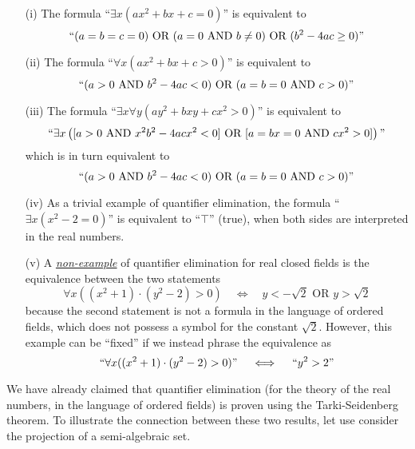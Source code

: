 \documentclass[12pt]{article}
\theoremstyle{definition}
\theoremstyle{remark}
\numberwithin{equation}{section}
\begin{document}
\begin{itemize}
    \item[(i)] The formula ``$\exists x(ax^2+bx+c=0)$''
    is equivalent to
    \begin{equation*}
        ``(a=b=c=0)\text{ OR }(a=0\text{ AND }b\neq 0)\text{ OR }(b^2-4ac\geq 0)\text{''}
    \end{equation*}
    \item[(ii)] The formula ``$\forall x(ax^2+bx+c>0)$'' is equivalent to
    \begin{equation*}
        ``(a>0\text{ AND }b^2-4ac<0)\text{ OR }(a=b=0\text{ AND }c>0)\text{''}
    \end{equation*}
    \item[(iii)] The formula ``$\exists x\forall y(ay^2+bxy+cx^2>0)$'' is equivalent to
    \begin{equation*}
        ``\exists x\left([a>0\text{ AND }x^2b^2-4acx^2<0]\text{ OR }[a=bx=0\text{ AND }cx^2>0]\right)\text{''}
    \end{equation*}
    which is in turn equivalent to
    \begin{equation*}
        ``(a>0\text{ AND }b^2-4ac<0)\text{ OR }(a=b=0\text{ AND }c>0)\text{''}
    \end{equation*}
    \item[(iv)] As a trivial example of quantifier elimination, the formula ``$\exists x(x^2-2=0)$'' is equivalent to ``$\top$'' (true), when both sides are interpreted in the real numbers.
    \item[(v)] A \underline{\textit{non-example}} of quantifier elimination for real closed fields is the equivalence between the two statements
    \begin{equation*}
        \forall x((x^2+1)\cdot(y^2-2)>0)\quad\iff\quad y<-\sqrt{2}\text{ OR }y>\sqrt{2}
    \end{equation*}
    because the second statement is not a formula in the language of ordered fields, which does not possess a symbol for the constant $\sqrt{2}$. However, this example can be ``fixed'' if we instead phrase the equivalence as
    \begin{equation*}
        ``\forall x((x^2+1)\cdot(y^2-2)>0)\text{''}\quad\iff\quad ``y^2>2\text{''}
    \end{equation*}
\end{itemize}

We have already claimed that quantifier elimination (for the theory of the real numbers, in the language of ordered fields) is proven using the Tarki-Seidenberg theorem. To illustrate the connection between these two results, let use consider the projection of a semi-algebraic set.
\end{document}
